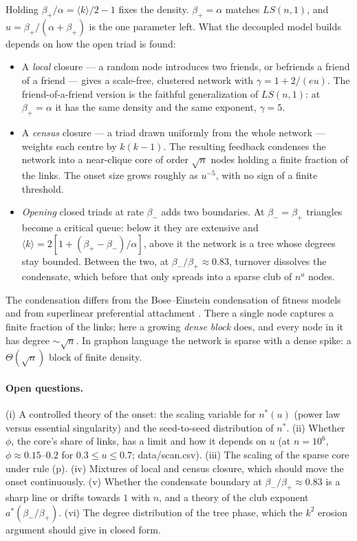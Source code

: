 \documentclass[aps,pre,twocolumn,superscriptaddress,floatfix,nofootinbib]{revtex4-2}
\begin{document}
Holding $\beta_+/\alpha=\langle k\rangle/2-1$ fixes the density. $\beta_+=\alpha$
matches $LS(n,1)$, and $u=\beta_+/(\alpha+\beta_+)$ is the one parameter left.
What the decoupled model builds depends on how the open triad is found:

\begin{itemize}
\item A \emph{local} closure --- a random node introduces two friends, or
  befriends a friend of a friend --- gives a scale-free, clustered network with
  $\gamma=1+2/(eu)$. The friend-of-a-friend version is the faithful
  generalization of $LS(n,1)$: at $\beta_+=\alpha$ it has the same density and the
  same exponent, $\gamma=5$.
\item A \emph{census} closure --- a triad drawn uniformly from the whole
  network --- weights each centre by $k(k-1)$. The resulting feedback condenses
  the network into a near-clique core of order $\sqrt n$ nodes holding a finite
  fraction of the links. The onset size grows roughly as $u^{-5}$, with no
  sign of a finite threshold.
\item \emph{Opening} closed triads at rate $\beta_-$ adds two boundaries. At
  $\beta_-=\beta_+$ triangles become a critical queue: below it they are
  extensive and $\langle k\rangle=2[1+(\beta_+-\beta_-)/\alpha]$, above it the
  network is a tree whose degrees stay bounded. Between the two, at
  $\beta_-/\beta_+\approx0.83$, turnover dissolves the condensate, which before
  that only spreads into a sparse club of $n^{a}$ nodes.
\end{itemize}

The condensation differs from the Bose--Einstein condensation of fitness models
\cite{bianconi2001} and from superlinear preferential attachment
\cite{krapivsky2000}. There a single node captures a finite fraction of the
links; here a growing \emph{dense block} does, and every node in it has degree
$\sim\sqrt n$. In graphon language the network is sparse with a dense spike: a
$\Theta(\sqrt n)$ block of finite density.

\paragraph*{Open questions.}
(i) A controlled theory of the onset: the scaling variable for
$n^*(u)$ (power law versus essential singularity) and the seed-to-seed
distribution of $n^*$. (ii) Whether $\phi$, the core's share of links, has a
limit and how it depends on $u$ (at $n=10^6$, $\phi\approx0.15$--$0.2$ for $0.3\le u\le0.7$; data/scan.csv). (iii) The scaling of the sparse
core under rule (p). (iv) Mixtures of local and census closure, which
should move the onset continuously. (v) Whether the condensate boundary at
$\beta_-/\beta_+\approx0.83$ is a sharp line or drifts towards $1$ with $n$, and
a theory of the club exponent $a^*(\beta_-/\beta_+)$. (vi) The degree
distribution of the tree phase, which the $k^2$ erosion argument should give in
closed form.
\end{document}
